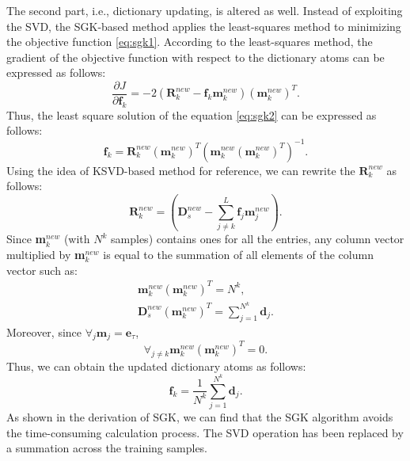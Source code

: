 The second part, i.e., dictionary updating, is altered as well. Instead of exploiting the SVD, the SGK-based method applies the least-squares method to minimizing the objective function \ref{eq:sgk1}. According to the least-squares method, the gradient of the objective function with respect to the dictionary atoms can be expressed as follows:
\begin{equation}
\label{eq:sgk2}
\frac{\partial J}{\partial \textbf{f}_{k}}=-2(\textbf{R}_{k}^{new}-\textbf{f}_{k}\textbf{m$_{k}^{new}$})(\textbf{m$_{k}^{new}$})^T.
\end{equation}
Thus, the least square solution of the equation \ref{eq:sgk2} can be expressed as follows:
\begin{equation} 
\textbf{f}_{k}=\textbf{R}_{k}^{new}(\textbf{m$_{k}^{new}$})^T(\textbf{m$_{k}^{new}$}(\textbf{m$_{k}^{new}$})^T)^{-1}.
\end{equation}
Using the idea of KSVD-based method for reference, we can rewrite the $\textbf{R}_{k}^{new}$ as follows:
\begin{equation}
\textbf{R}_{k}^{new}=(\textbf{D}_s^{new}-\sum_{j\neq k}^{L}\textbf{f}_{j}\textbf{m$_{j}^{new}$}).
\end{equation}
Since \textbf{m$_{k}^{new}$} (with $N^{k}$ samples) contains ones for all the entries, any column vector multiplied by \textbf{m$_{k}^{new}$} is equal to the summation of all elements of the column vector such as:
\begin{equation}
\begin{split}
\textbf{m$_{k}^{new}$}(\textbf{m$_{k}^{new}$})^T= N^{k},\\
\textbf{D}_s^{new}(\textbf{m$_{k}^{new}$})^T=\sum_{j=1}^{N^{k}}\textbf{d}_{j}.
\end{split}
\end{equation}
Moreover, since $\forall_{j}\textbf{m}_{j}=\textbf{e}_{\tau}$, 
\begin{equation}
\forall_{j\neq k}\textbf{m$_{k}^{new}$}(\textbf{m$_{k}^{new}$})^T=0.
\end{equation}
Thus, we can obtain the updated dictionary atoms as follows:
\begin{equation} 
\textbf{f}_{k}=\frac{1}{N^{k}}\sum_{j=1}^{N^{k}}\textbf{d}_{j}.
\end{equation}
As shown in the derivation of SGK, we can find that the SGK algorithm avoids the time-consuming calculation process. The SVD operation has been replaced by a summation across the training samples.
